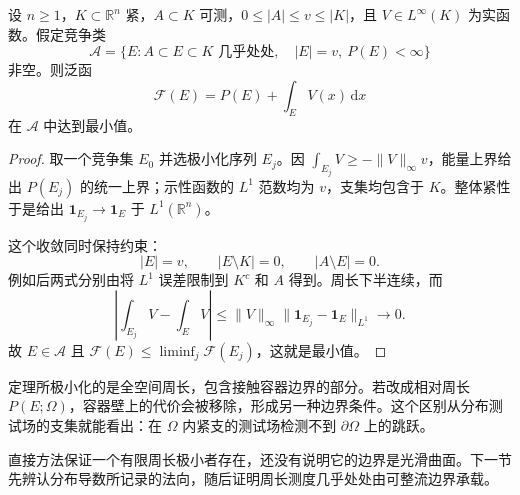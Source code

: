 \begin{theorem}\label{g3:thm:finite-perimeter-direct-method}
	设 \(n\ge1\)，\(K\subset\mathbb R^n\) 紧，\(A\subset K\) 可测，\(0\le |A|\le v\le |K|\)，且 \(V\in L^\infty(K)\) 为实函数。假定竞争类
	\[
		\mathcal A=\{E:A\subset E\subset K\text{ 几乎处处},\quad
		|E|=v,\ P(E)<\infty\}
	\]
	非空。则泛函
	\[
		\mathcal F(E)=P(E)+\int_E V(x)\,\mathrm dx
	\]
	在 \(\mathcal A\) 中达到最小值。
\end{theorem}
\begin{proof}
	取一个竞争集 \(E_0\) 并选极小化序列 \(E_j\)。因
	\(\int_{E_j}V\ge-\|V\|_\infty v\)，能量上界给出 \(P(E_j)\) 的统一上界；示性函数的 \(L^1\) 范数均为 \(v\)，支集均包含于 \(K\)。整体紧性于是给出
	\(\mathbf1_{E_j}\to\mathbf1_E\) 于 \(L^1(\mathbb R^n)\)。

	这个收敛同时保持约束：
	\[
		|E|=v,\qquad
		|E\setminus K|=0,\qquad |A\setminus E|=0.
	\]
	例如后两式分别由将 \(L^1\) 误差限制到 \(K^c\) 和 \(A\) 得到。周长下半连续，而
	\[
		\left|\int_{E_j}V-\int_EV\right|
		\le\|V\|_\infty\|\mathbf1_{E_j}-\mathbf1_E\|_{L^1}
		\longrightarrow0.
	\]
	故 \(E\in\mathcal A\) 且 \(\mathcal F(E)\le\liminf_j\mathcal F(E_j)\)，这就是最小值。
\end{proof}

定理所极小化的是全空间周长，包含接触容器边界的部分。若改成相对周长 \(P(E;\Omega)\)，容器壁上的代价会被移除，形成另一种边界条件。这个区别从分布测试场的支集就能看出：在 \(\Omega\) 内紧支的测试场检测不到 \(\partial\Omega\) 上的跳跃。

\ProseParagraphBreak
直接方法保证一个有限周长极小者存在，还没有说明它的边界是光滑曲面。下一节先辨认分布导数所记录的法向，随后证明周长测度几乎处处由可整流边界承载。
